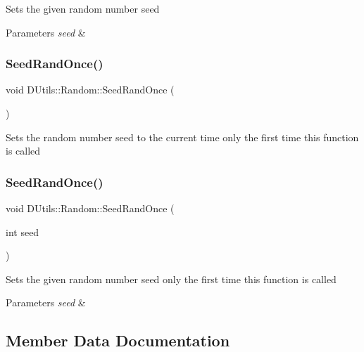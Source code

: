 Sets the given random number seed 
\begin{DoxyParams}{Parameters}
{\em seed} & \\
\hline
\end{DoxyParams}
\mbox{\label{class_d_utils_1_1_random_a168e77d82ce1e66c6759e97ef27adbbc}} 
\subsubsection{\texorpdfstring{Seed\+Rand\+Once()}{SeedRandOnce()}\hspace{0.1cm}{\footnotesize\ttfamily [1/2]}}
{\footnotesize\ttfamily void D\+Utils\+::\+Random\+::\+Seed\+Rand\+Once (\begin{DoxyParamCaption}{ }\end{DoxyParamCaption})\hspace{0.3cm}{\ttfamily [static]}}

Sets the random number seed to the current time only the first time this function is called \mbox{\label{class_d_utils_1_1_random_ad3652f5d105ca4f6f22696b64f2a4a5d}} 
\subsubsection{\texorpdfstring{Seed\+Rand\+Once()}{SeedRandOnce()}\hspace{0.1cm}{\footnotesize\ttfamily [2/2]}}
{\footnotesize\ttfamily void D\+Utils\+::\+Random\+::\+Seed\+Rand\+Once (\begin{DoxyParamCaption}\item[{int}]{seed }\end{DoxyParamCaption})\hspace{0.3cm}{\ttfamily [static]}}

Sets the given random number seed only the first time this function is called 
\begin{DoxyParams}{Parameters}
{\em seed} & \\
\hline
\end{DoxyParams}


\subsection{Member Data Documentation}
\mbox{\label{class_d_utils_1_1_random_af24ca62703bbf7428a4ea7787144bfb9}} 
